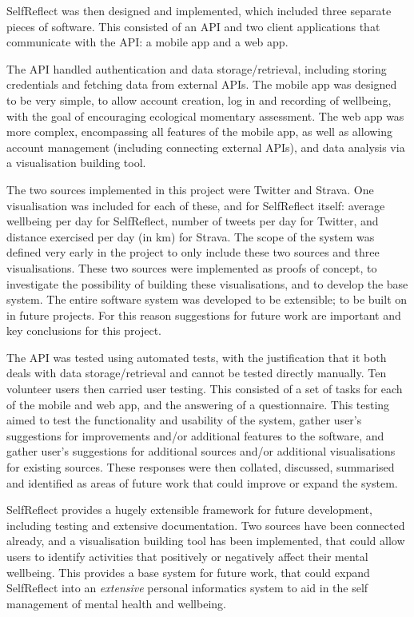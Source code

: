 \documentclass[11pt,openright,a4paper]{report}
\begin{document}
SelfReflect was then designed and implemented, which included three separate pieces of software. This consisted of an API and two client applications that communicate with the API: a mobile app and a web app.

The API handled authentication and data storage/retrieval, including storing credentials and fetching data from external APIs. The mobile app was  designed to be very simple, to allow account creation, log in and recording of wellbeing, with the goal of encouraging ecological momentary assessment. The web app was more complex, encompassing all features of the mobile app, as well as allowing account management (including connecting external APIs), and data analysis via a visualisation building tool.

The two sources implemented in this project were Twitter and Strava. One visualisation was included for each of these, and for SelfReflect itself: average wellbeing per day for SelfReflect, number of tweets per day for Twitter, and distance exercised per day (in km) for Strava. The scope of the system was defined very early in the project to only include these two sources and three visualisations. These two sources were implemented as proofs of concept, to investigate the possibility of building these visualisations, and to develop the base system. The entire software system was developed to be extensible; to be built on in future projects. For this reason suggestions for future work are important and key conclusions for this project.

The API was tested using automated tests, with the justification that it both deals with data storage/retrieval and cannot be tested directly manually. Ten volunteer users then carried user testing. This consisted of a set of tasks for each of the mobile and web app, and the answering of a questionnaire. This testing aimed to test the functionality and usability of the system, gather user's suggestions for improvements and/or additional features to the software, and gather user's suggestions for additional sources and/or additional visualisations for existing sources. These responses were then collated, discussed, summarised and identified as areas of future work that could improve or expand the system.

SelfReflect provides a hugely extensible framework for future development, including testing and extensive documentation. Two sources have been connected already, and a visualisation building tool has been implemented, that could allow users to identify activities that positively or negatively affect their mental wellbeing. This provides a base system for future work, that could expand SelfReflect into an \emph{extensive} personal informatics system to aid in the self management of mental health and wellbeing.
\end{document}
